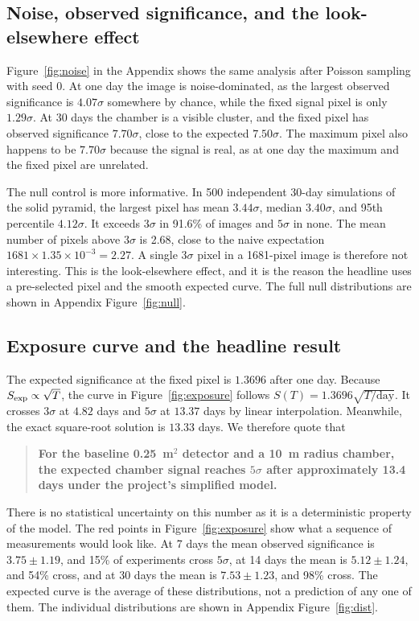\documentclass{article}
\begin{document}
\subsection{Noise, observed significance, and the look-elsewhere effect}

Figure~\ref{fig:noise} in the Appendix shows the same analysis after Poisson
sampling with seed 0. At one day the image is noise-dominated, as the largest
observed significance is $4.07\sigma$ somewhere by chance, while the fixed
signal pixel is only $1.29\sigma$. At 30 days the chamber is a visible cluster, and the fixed pixel
has observed significance $7.70\sigma$, close to the expected $7.50\sigma$.
The maximum pixel also happens to be $7.70\sigma$ because the signal is real, as
at one day the maximum and the fixed pixel are unrelated.


The null control is more informative. In 500 independent 30-day simulations of
the solid pyramid, the largest pixel has mean $3.44\sigma$, median
$3.40\sigma$, and 95th percentile $4.12\sigma$. It exceeds $3\sigma$ in 91.6\%
of images and $5\sigma$ in none. The mean number of pixels above $3\sigma$ is
2.68, close to the naive expectation $1681\times1.35\times10^{-3}=2.27$. A
single $3\sigma$ pixel in a 1681-pixel image is therefore not interesting. This
is the look-elsewhere effect, and it is the reason the headline uses a
pre-selected pixel and the smooth expected curve. The full null distributions
are shown in Appendix Figure~\ref{fig:null}.


\subsection{Exposure curve and the headline result}

The expected significance at the fixed pixel is $1.3696$ after one day. Because
$S_{\rm exp}\propto\sqrt{T}$, the curve in Figure~\ref{fig:exposure} follows
$S(T)=1.3696\sqrt{T/\mathrm{day}}$. It crosses $3\sigma$ at $4.82$ days and
$5\sigma$ at $13.37$ days by linear interpolation. Meanwhile, the exact square-root
solution is $13.33$ days. We therefore quote that

\begin{quote}
\textbf{For the baseline 0.25~m$^2$ detector and a 10~m radius chamber, the
expected chamber signal reaches $5\sigma$ after approximately 13.4 days under
the project's simplified model.}
\end{quote}

There is no statistical uncertainty on this number as it is a deterministic
property of the model. The red points in Figure~\ref{fig:exposure} show what a
sequence of measurements would look like. At 7 days the mean observed
significance is $3.75\pm1.19$, and 15\% of experiments cross $5\sigma$, at
14 days the mean is $5.12\pm1.24$, and 54\% cross, and at 30 days the mean is
$7.53\pm1.23$, and 98\% cross. The expected curve is the average of these
distributions, not a prediction of any one of them. The individual distributions
are shown in Appendix Figure~\ref{fig:dist}.
\end{document}
